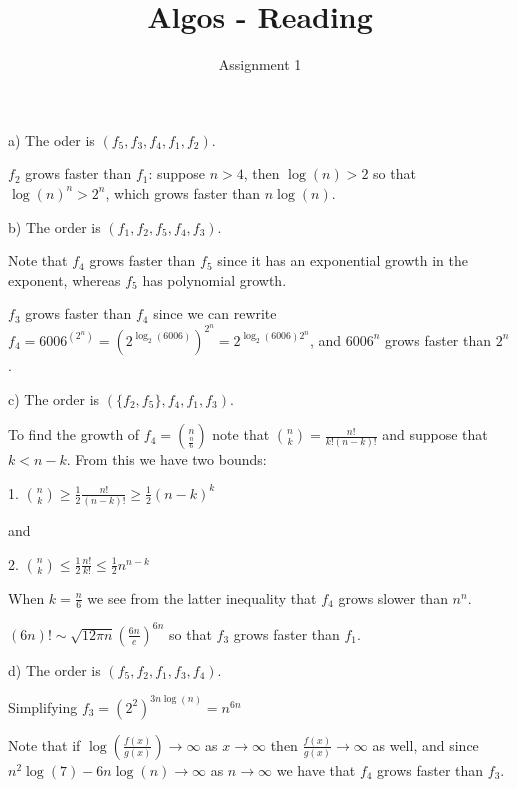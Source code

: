 \documentclass[12pt]{article}
\theoremstyle{plain}
\newenvironment{problem}[2][Problem]{\begin{trivlist}
		\item[\hskip \labelsep {\bfseries #1}\hskip \labelsep {\bfseries #2.}]}{\end{trivlist}}
\theoremstyle{remark}
\theoremstyle{plain}
\theoremstyle{definition}
\theoremstyle{remark}
\begin{document}
	
	\title{Algos - Reading}
	\author{Assignment 1}
	\date{}
	\maketitle
	
	\begin{problem} {1-1}
		a) The oder is $(f_5, f_3, f_4, f_1, f_2)$.
		
		$f_2$ grows faster than $f_1$: suppose $n>4$, then $\log(n)>2$ so that $\log(n)^n > 2^n$, which grows faster than $n\log(n)$.
		
		
		b) The order is $(f_1, f_2, f_5, f_4, f_3)$.
		
		Note that $f_4$ grows faster than $f_5$ since it has an exponential growth in the exponent, whereas $f_5$ has polynomial growth.
		
		$f_3$ grows faster than $f_4$ since we can rewrite $f_4 = 6006^{(2^n)} = \left(2^{\log_2 \left(6006\right)}\right)^{2^n} = 2^{\log_2\left(6006\right)2^n}$, and $6006^n$ grows faster than $2^n$.
		
		c) The order is $(\{f_2,f_5\},f_4,f_1,f_3)$.
		
		To find the growth of $f_4 = {n\choose \frac n 6}$ note that ${n \choose k }= \frac{n!}{k! (n-k)!}$ and suppose that  $k < n-k$. From this we have two bounds:
		
		1. ${n \choose k} \geq \frac 1 2 \frac{n!}{(n-k)!} \geq \frac 1 2 (n-k)^k$ 
		
		and 
		
		2. ${n \choose k} \leq \frac 1 2 \frac {n!}{k!}\leq \frac 1 2 n^{n-k}$
		
		When $k=\frac n 6$ we see from the latter inequality that $f_4$ grows slower than $n^n$.
		
	 
		
		$(6n)! \sim \sqrt{12 \pi n}\left(\frac{6n}{e}\right)^{6n}$ so that $f_3$ grows faster than $f_1$.
		
		d) The order is $(f_5,f_2,f_1,f_3, f_4)$.
		
		Simplifying $f_3 = \left(2^2\right)^{3n\log(n)}=n^{6n}$
		
		Note that if $\log\left(\frac{f(x)}{g(x)}\right)\rightarrow\infty$ as $x\rightarrow \infty$ then $\frac{f(x)}{g(x)}\rightarrow \infty$ as well, and since $n^2\log\left(7\right) - 6n \log\left(n\right)\rightarrow \infty$ as $n\rightarrow \infty$ we have that $f_4$ grows faster than $f_3$.
	\end{problem}
\end{document}
